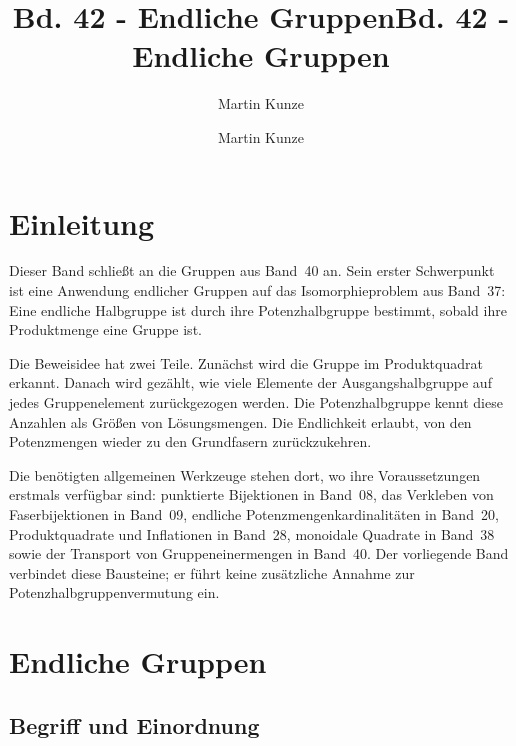 \documentclass[main.tex]{subfiles}
\title{Bd. 42 - Endliche Gruppen}
\author{Martin Kunze}
\date{}
\begin{document}
\title{Bd. 42 - Endliche Gruppen}
\author{Martin Kunze}
\date{}
\hypersetup{pageanchor=false}
\maketitle
\hypersetup{pageanchor=true}
\setcounter{tocdepth}{3}
\tableofcontents
\setcounter{file}{42}
\renewcommand{\FormulaBandID}{42}

\chapter{Einleitung}

Dieser Band schließt an die Gruppen aus Band~40 an. Sein erster Schwerpunkt
ist eine Anwendung endlicher Gruppen auf das Isomorphieproblem aus Band~37:
Eine endliche Halbgruppe ist durch ihre Potenzhalbgruppe bestimmt, sobald
ihre Produktmenge eine Gruppe ist.

Die Beweisidee hat zwei Teile. Zunächst wird die Gruppe im Produktquadrat
erkannt. Danach wird gezählt, wie viele Elemente der Ausgangshalbgruppe auf
jedes Gruppenelement zurückgezogen werden. Die Potenzhalbgruppe kennt diese
Anzahlen als Größen von Lösungsmengen. Die Endlichkeit erlaubt, von den
Potenzmengen wieder zu den Grundfasern zurückzukehren.

Die benötigten allgemeinen Werkzeuge stehen dort, wo ihre Voraussetzungen
erstmals verfügbar sind: punktierte Bijektionen in Band~08, das Verkleben
von Faserbijektionen in Band~09, endliche Potenzmengenkardinalitäten in
Band~20, Produktquadrate und Inflationen in Band~28, monoidale Quadrate in
Band~38 sowie der Transport von Gruppeneinermengen in Band~40.
Der vorliegende Band verbindet diese Bausteine; er führt keine zusätzliche
Annahme zur Potenzhalbgruppenvermutung ein.

\chapter{Endliche Gruppen}

\section{Begriff und Einordnung}

\end{document}
